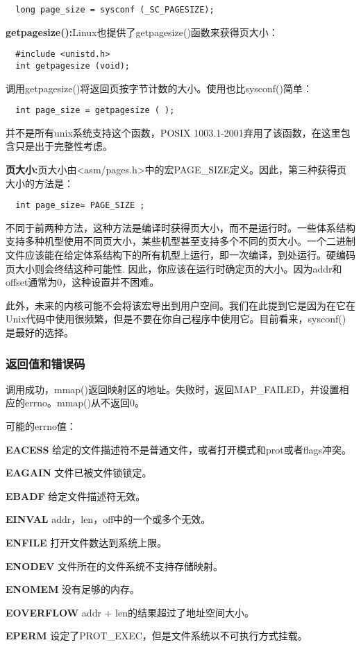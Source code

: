 \begin{lstlisting}
  long page_size = sysconf (_SC_PAGESIZE);
\end{lstlisting}

\textbf{getpagesize():}Linux也提供了getpagesize()函数来获得页大小：

\begin{lstlisting}
  #include <unistd.h>
  int getpagesize (void);
\end{lstlisting}

调用getpagesize()将返回页按字节计数的大小。使用也比sysconf()简单：

\begin{lstlisting}
  int page_size = getpagesize ( );
\end{lstlisting}

并不是所有unix系统支持这个函数，POSIX 1003.1-2001弃用了该函数，在这里包含只是出于完整性考虑。

\textbf{页大小:}页大小由<asm/pages.h>中的宏PAGE\_SIZE定义。因此，第三种获得页大小的方法是：

\begin{lstlisting}
  int page_size= PAGE_SIZE ;
\end{lstlisting}

不同于前两种方法，这种方法是编译时获得页大小，而不是运行时。一些体系结构支持多种机型使用不同页大小，某些机型甚至支持多个不同的页大小。一个二进制文件应该能在给定体系结构下的所有机型上运行，即一次编译，到处运行。硬编码页大小则会终结这种可能性. 因此，你应该在运行时确定页的大小。因为addr和offset通常为0，这种设置并不困难。

此外，未来的内核可能不会将该宏导出到用户空间。我们在此提到它是因为在它在Unix代码中使用很频繁，但是不要在你自己程序中使用它。目前看来，sysconf()是最好的选择。

\subsubsection{返回值和错误码}

调用成功，mmap()返回映射区的地址。失败时，返回MAP\_FAILED，并设置相应的errno。mmap()从不返回0。

可能的errno值：

\begin{eqlist*}
\item[\textbf{EACESS}] 给定的文件描述符不是普通文件，或者打开模式和prot或者flags冲突。
\item[\textbf{EAGAIN}] 文件已被文件锁锁定。
\item[\textbf{EBADF}] 给定文件描述符无效。
\item[\textbf{EINVAL}] addr，len，off中的一个或多个无效。
\item[\textbf{ENFILE}] 打开文件数达到系统上限。
\item[\textbf{ENODEV}] 文件所在的文件系统不支持存储映射。
\item[\textbf{ENOMEM}] 没有足够的内存。
\item[\textbf{EOVERFLOW}] addr + len的结果超过了地址空间大小。
\item[\textbf{EPERM}] 设定了PROT\_EXEC，但是文件系统以不可执行方式挂载。
\end{eqlist*}

